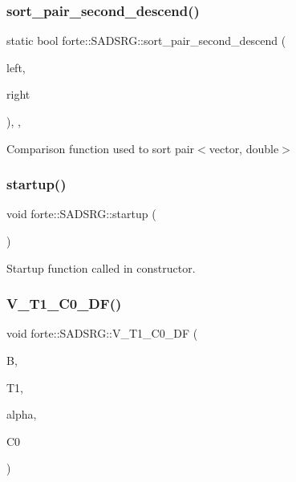 \subsubsection{\texorpdfstring{sort\+\_\+pair\+\_\+second\+\_\+descend()}{sort\_pair\_second\_descend()}}
{\footnotesize\ttfamily static bool forte\+::\+S\+A\+D\+S\+R\+G\+::sort\+\_\+pair\+\_\+second\+\_\+descend (\begin{DoxyParamCaption}\item[{const std\+::pair$<$ std\+::vector$<$ size\+\_\+t $>$, double $>$ \&}]{left,  }\item[{const std\+::pair$<$ std\+::vector$<$ size\+\_\+t $>$, double $>$ \&}]{right }\end{DoxyParamCaption})\hspace{0.3cm}{\ttfamily [inline]}, {\ttfamily [static]}, {\ttfamily [protected]}}



Comparison function used to sort pair$<$vector, double$>$ 

\mbox{\label{classforte_1_1_s_a_d_s_r_g_a100d67f2bd75b51bfaa9a7e1b1c4ac75}} 
\subsubsection{\texorpdfstring{startup()}{startup()}}
{\footnotesize\ttfamily void forte\+::\+S\+A\+D\+S\+R\+G\+::startup (\begin{DoxyParamCaption}{ }\end{DoxyParamCaption})\hspace{0.3cm}{\ttfamily [protected]}}



Startup function called in constructor. 

\mbox{\label{classforte_1_1_s_a_d_s_r_g_a6c409bc7d2f3a1be9a87f0d2205196c2}} 
\subsubsection{\texorpdfstring{V\+\_\+\+T1\+\_\+\+C0\+\_\+\+D\+F()}{V\_T1\_C0\_DF()}}
{\footnotesize\ttfamily void forte\+::\+S\+A\+D\+S\+R\+G\+::\+V\+\_\+\+T1\+\_\+\+C0\+\_\+\+DF (\begin{DoxyParamCaption}\item[{Blocked\+Tensor \&}]{B,  }\item[{Blocked\+Tensor \&}]{T1,  }\item[{const double \&}]{alpha,  }\item[{double \&}]{C0 }\end{DoxyParamCaption})\hspace{0.3cm}{\ttfamily [protected]}}




